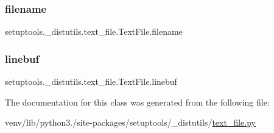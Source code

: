 \subsubsection{\texorpdfstring{filename}{filename}}
{\footnotesize\ttfamily setuptools.\+\_\+distutils.\+text\+\_\+file.\+Text\+File.\+filename}

\mbox{\label{classsetuptools_1_1__distutils_1_1text__file_1_1TextFile_ae3e8575ddfdc38a481b2d3d1eff04310}} 
\subsubsection{\texorpdfstring{linebuf}{linebuf}}
{\footnotesize\ttfamily setuptools.\+\_\+distutils.\+text\+\_\+file.\+Text\+File.\+linebuf}



The documentation for this class was generated from the following file\+:\begin{DoxyCompactItemize}
\item 
venv/lib/python3./site-\/packages/setuptools/\+\_\+distutils/\hyperlink{text__file_8py}{text\+\_\+file.\+py}\end{DoxyCompactItemize}
